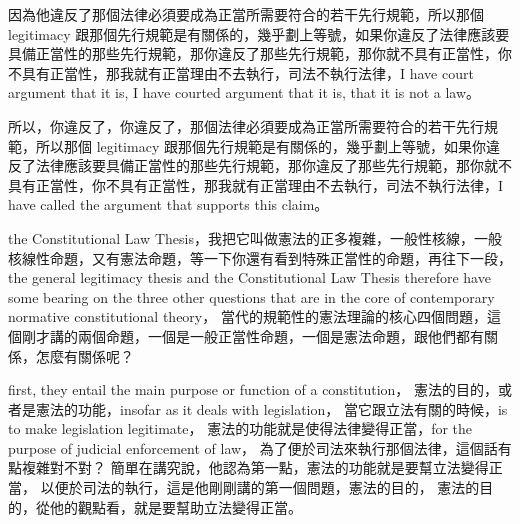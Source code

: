 \hypertarget{w02:cue:65}{}因為他違反了那個法律必須要成為正當所需要符合的若干先行規範，所以那個 legitimacy 跟那個先行規範是有關係的，幾乎劃上等號，如果你違反了法律應該要具備正當性的那些先行規範，那你違反了那些先行規範，那你就不具有正當性，你不具有正當性，那我就有正當理由不去執行，司法不執行法律，I have court argument that it is, I have courted argument that it is, that it is not a law。

\hypertarget{w02:cue:66}{}所以，你違反了，你違反了，那個法律必須要成為正當所需要符合的若干先行規範，所以那個 legitimacy 跟那個先行規範是有關係的，幾乎劃上等號，如果你違反了法律應該要具備正當性的那些先行規範，那你違反了那些先行規範，那你就不具有正當性，你不具有正當性，那我就有正當理由不去執行，司法不執行法律，I have called the argument that supports this claim。

\hypertarget{w02:cue:67}{}the Constitutional Law Thesis，我把它叫做憲法的正多複雜，一般性核線，一般核線性命題，又有憲法命題，等一下你還有看到特殊正當性的命題，再往下一段，
\hypertarget{w02:cue:68}{}the general legitimacy thesis and the Constitutional Law Thesis therefore have some bearing on the three other questions that are in the core of contemporary normative constitutional theory，
\hypertarget{w02:cue:69}{}當代的規範性的憲法理論的核心四個問題，這個剛才講的兩個命題，一個是一般正當性命題，一個是憲法命題，跟他們都有關係，怎麼有關係呢？

\hypertarget{w02:cue:70}{}first, they entail the main purpose or function of a constitution，
\hypertarget{w02:cue:71}{}憲法的目的，或者是憲法的功能，insofar as it deals with legislation，
\hypertarget{w02:cue:72}{}當它跟立法有關的時候，is to make legislation legitimate，
\hypertarget{w02:cue:73}{}憲法的功能就是使得法律變得正當，for the purpose of judicial enforcement of law，
\hypertarget{w02:cue:74}{}為了便於司法來執行那個法律，這個話有點複雜對不對？
\hypertarget{w02:cue:75}{}簡單在講究說，他認為第一點，憲法的功能就是要幫立法變得正當，
\hypertarget{w02:cue:76}{}以便於司法的執行，這是他剛剛講的第一個問題，憲法的目的，
\hypertarget{w02:cue:77}{}憲法的目的，從他的觀點看，就是要幫助立法變得正當。

